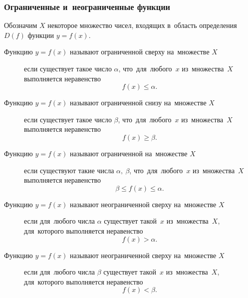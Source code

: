 \documentclass[]{scrartcl}
\begin{document}
\subsubsection{Ограниченные и~неограниченные функции}
Обозначим ${\textstyle X}$ некоторое множество чисел, входящих в~область определения  ${\textstyle D(f)}$ функции ${\textstyle y=f(x)}$.
\begin{description}
	\item[Функцию ${\textstyle y=f(x)}$ называют ограниченной сверху на~множестве ${\textstyle X}$] если существует такое число ${\textstyle \alpha}$, что~для~любого~${\textstyle x}$   из~множества~${\textstyle X}$ выполняется неравенство
	\begin{equation}\label{eq:function-1}
	f(x)\leq \alpha.
	\end{equation}
\end{description}
\begin{description}
	\item[Функцию ${\textstyle y=f(x)}$ называют ограниченной снизу на~множестве ${\textstyle X}$] если существует такое число ${\textstyle \beta}$, что~для~любого~${\textstyle x}$   из~множества~${\textstyle X}$ выполняется неравенство
	\begin{equation}\label{eq:function-2}
	f(x)\geq \beta.
	\end{equation}
\end{description}
\begin{description}
	\item[Функцию ${\textstyle y=f(x)}$ называют ограниченной на~множестве ${\textstyle X}$] если существуют такие числа ${\textstyle \alpha,\ \beta}$, что~для~любого~${\textstyle x}$  из~множества~${\textstyle X}$ выполняется неравенство
	\begin{equation}\label{eq:function-3}
	\beta \leq f(x)\leq \alpha.
	\end{equation}
\end{description}
\begin{description}
	\item[Функцию ${\textstyle y=f(x)}$ называют неограниченной сверху на~множестве ${\textstyle X}$] если для~любого числа ${\textstyle \alpha}$ существует такой~${\textstyle x}$  из~множества~${\textstyle X}$, для~которого выполняется неравенство
	\begin{equation}\label{eq:function-4}
	f(x) > \alpha.
	\end{equation}
\end{description}
\begin{description}
	\item[Функцию ${\textstyle y=f(x)}$ называют неограниченной сверху на~множестве ${\textstyle X}$] если для~любого числа ${\textstyle \beta}$ существует такой~${\textstyle x}$  из~множества~${\textstyle X}$, для~которого выполняется неравенство
	\begin{equation}\label{eq:function-5}
	f(x) < \beta.
	\end{equation}
\end{description}
\end{document}
